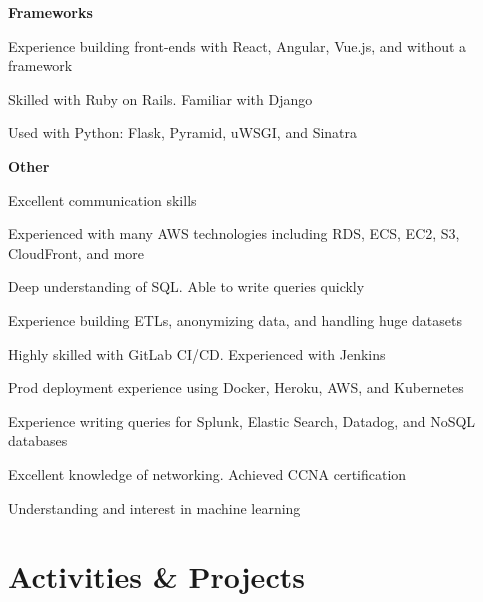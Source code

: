 \documentclass[margin,line]{resume}
\begin{document}
\begin{resume}
    \hspace{2.4mm}\textbf{Frameworks}\vspace{1mm}
    \begin{list2}
        \item Experience building front-ends with React, Angular, Vue.js, and without a framework
        \item Skilled with Ruby on Rails. Familiar with Django
        \item Used with Python: Flask, Pyramid, uWSGI, and Sinatra
    \end{list2}\vspace{-1.5mm}

    \hspace{2.4mm}\textbf{Other}\vspace{1mm}
    \begin{list2}
        \item Excellent communication skills
        \item Experienced with many AWS technologies including RDS, ECS, EC2, S3, CloudFront, and more
        \item Deep understanding of SQL. Able to write queries quickly
        \item Experience building ETLs, anonymizing data, and handling huge datasets
        \item Highly skilled with GitLab CI/CD. Experienced with Jenkins
        \item Prod deployment experience using Docker, Heroku, AWS, and Kubernetes
        \item Experience writing queries for Splunk, Elastic Search, Datadog, and NoSQL databases
        \item Excellent knowledge of networking. Achieved CCNA certification
        \item Understanding and interest in machine learning
    \end{list2}\vspace{-1.5mm}

\sectionline

    \section{\mysidestyle \textbf{\large{A}\small{ctivities \& Projects}}}


\end{resume}
\end{document}
